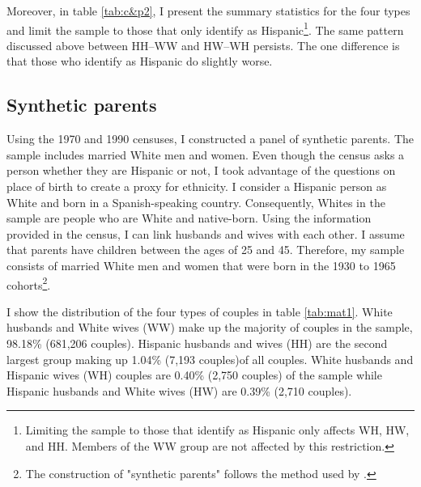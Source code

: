\documentclass{wptemp}
\begin{document}
Moreover, in table \ref{tab:c&p2}, I present the summary statistics for the four types and limit the sample to those that only identify as Hispanic\footnote{Limiting the sample to those that identify as Hispanic only affects WH, HW, and HH. Members of the WW group are not affected by this restriction.}. The same pattern discussed above between HH--WW and HW--WH persists. The one difference is that those who identify as Hispanic do slightly worse.

 
\subsection{Synthetic parents}

Using the 1970 and 1990 censuses, I constructed a panel of synthetic parents. The sample includes married White men and women. Even though the census asks a person whether they are Hispanic or not, I took advantage of the questions on place of birth to create a proxy for ethnicity. I consider a Hispanic person as White and born in a Spanish-speaking country. Consequently, Whites in the sample are people who are White and native-born. Using the information provided in the census, I can link husbands and wives with each other. I assume that parents have children between the ages of 25 and 45. Therefore, my sample consists of married White men and women that were born in the 1930 to 1965 cohorts\footnote{The construction of "synthetic parents" follows the method used by \citet{rubinstein2014pride}.}.

I show the distribution of the four types of couples in table \ref{tab:mat1}. White husbands and White wives (WW) make up the majority of couples in the sample, 98.18\% (681,206 couples). Hispanic husbands and wives (HH) are the second largest group making up 1.04\% (7,193 couples)of all couples. White husbands and Hispanic wives (WH) couples are 0.40\% (2,750 couples) of the sample while Hispanic husbands and White wives (HW) are 0.39\% (2,710 couples). 
\end{document}
